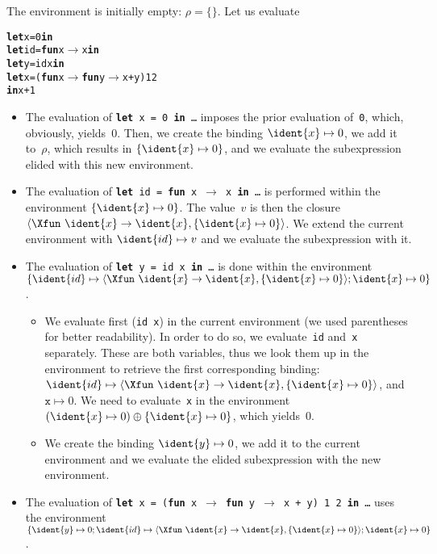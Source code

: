 The environment is initially empty: \(\rho = \{\}\). Let us evaluate
\begin{alltt}
\textbf{let} x = 0 \textbf{in}
  \textbf{let} id = \textbf{fun} x \(\rightarrow\) x \textbf{in}
  \textbf{let} y = id x \textbf{in}
  \textbf{let} x = (\textbf{fun} x \(\rightarrow\) \textbf{fun} y \(\rightarrow\) x + y) 1 2
\textbf{in} x+1
\end{alltt}
\begin{itemize}

\item The evaluation of \texttt{\textbf{let} x = 0 \textbf{in} \ldots}
  imposes the prior evaluation of~\texttt{0}, which, obviously,
  yields~\(0\). Then, we create the binding $\ident{x} \mapsto 0$, we
  add it to~\(\rho\), which results in $\{\ident{x} \mapsto 0\}$, and
  we evaluate the subexpression elided with this new environment.

\item The evaluation of \texttt{\textbf{let} id = \textbf{fun} x \(\rightarrow\) x
    \textbf{in} \ldots} is performed within the environment
  $\{\ident{x} \mapsto 0\}$. The value~\(v\) is then the closure
  $\langle\Xfun \,\, \ident{x} \rightarrow \ident{x}, \{\ident{x} \mapsto
  0\}\rangle$. We extend the current environment with
  $\ident{id} \mapsto v$ and we evaluate the subexpression with it.

\item The evaluation of \texttt{\textbf{let} y = id x \textbf{in}
    \ldots} is done within the environment $\{\ident{id} \mapsto
  \langle\Xfun \,\, \ident{x} \rightarrow \ident{x}, \{\ident{x}
  \mapsto 0\}\rangle; \ident{x} \mapsto 0\}$.
    \begin{itemize}

      \item We evaluate first (\texttt{id x}) in the current
        environment (we used parentheses for better readability). In
        order to do so, we evaluate~\texttt{id} and~\texttt{x}
        separately. These are both variables, thus we look them up in
        the environment to retrieve the first corresponding
        binding: \(\ident{id} \mapsto \langle\Xfun \,\, \ident{x} \rightarrow \ident{x}, \{\ident{x} \mapsto
        0\}\rangle\), and \(\texttt{x} \mapsto 0\). We need to
        evaluate~\texttt{x} in the environment $(\ident{x} \mapsto
        0) \oplus \{\ident{x} \mapsto 0\}$, which yields~\(0\).

      \item We create the binding $\ident{y} \mapsto 0$, we add it to
        the current environment and we evaluate the elided
        subexpression with the new environment.

    \end{itemize}

  \item The evaluation of \texttt{\textbf{let} x = (\textbf{fun} x \(\rightarrow\)
      \textbf{fun} y \(\rightarrow\) x + y) 1 2 \textbf{in} \ldots}
      uses the environment $\{\ident{y} \mapsto 0; \ident{id} \mapsto
    \langle\Xfun \,\, \ident{x} \rightarrow \ident{x}, \{\ident{x}
    \mapsto 0\}\rangle; \ident{x} \mapsto 0\}$.

\end{itemize}

